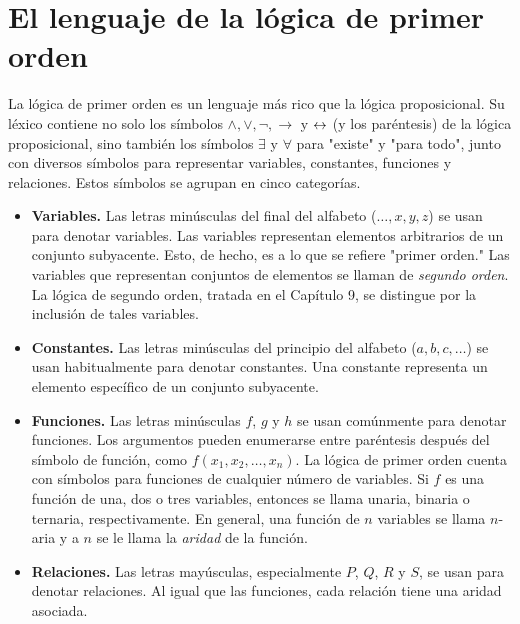 \documentclass[12pt,a4paper]{book}
\newcommand{\comillas}[1]{"#1"}
\begin{document}
    \section{El lenguaje de la lógica de primer orden}

    La lógica de primer orden es un lenguaje más rico que la lógica proposicional. Su léxico contiene no solo los símbolos
    $\wedge,\vee,\neg,\rightarrow$ y $\leftrightarrow$ (y los paréntesis) de la lógica proposicional, sino también los símbolos $\exists$ y
    $\forall$ para \comillas{existe} y \comillas{para todo}, junto con diversos símbolos para representar variables,
    constantes, funciones y relaciones. Estos símbolos se agrupan en cinco categorías.

    \begin{itemize}
        \item[$\bullet$] \textbf{Variables.} Las letras minúsculas del final del alfabeto ($\dots,x,y,z$) se usan para
        denotar variables. Las variables representan elementos arbitrarios de un conjunto subyacente. Esto, de hecho, es a lo
        que se refiere \comillas{primer orden.} Las variables que representan conjuntos de elementos se llaman de
        \textit{segundo orden}. La lógica de segundo orden, tratada en el Capítulo 9, se distingue por la inclusión de tales
        variables.
        \item[$\bullet$] \textbf{Constantes.} Las letras minúsculas del principio del alfabeto ($a,b,c,\dots$) se usan
        habitualmente para denotar constantes. Una constante representa un elemento específico de un conjunto subyacente.
        \item[$\bullet$] \textbf{Funciones.} Las letras minúsculas $f$, $g$ y $h$ se usan comúnmente para denotar funciones.
        Los argumentos pueden enumerarse entre paréntesis después del símbolo de función, como $f(x_{1},x_{2},\dots,x_{n})$.
        La lógica de primer orden cuenta con símbolos para funciones de cualquier número de variables. Si $f$ es una función
        de una, dos o tres variables, entonces se llama unaria, binaria o ternaria, respectivamente. En general, una función
        de $n$ variables se llama $n$-aria y a $n$ se le llama la \textit{aridad} de la función.
        \item[$\bullet$] \textbf{Relaciones.} Las letras mayúsculas, especialmente $P$, $Q$, $R$ y $S$, se usan para denotar
        relaciones. Al igual que las funciones, cada relación tiene una aridad asociada.
    \end{itemize}
\end{document}
